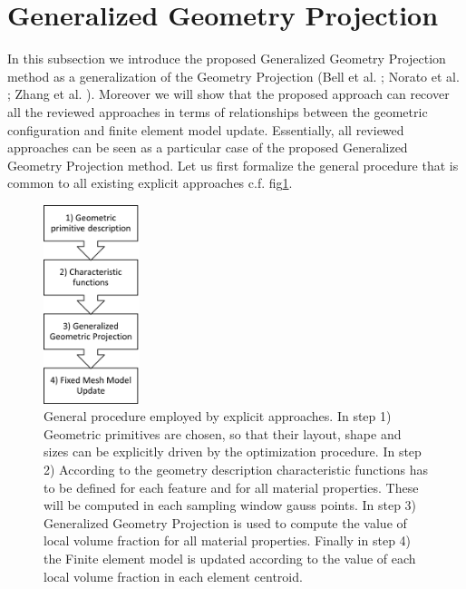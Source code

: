 \section{Generalized Geometry Projection}
\label{GGP}
In this subsection we introduce the proposed Generalized Geometry Projection method as a generalization of the Geometry Projection (Bell et al. \cite{bell2012geometry}; Norato et al. \cite{norato2015geometry}; Zhang et al. \cite{zhang2016geometry}). Moreover we will show that the proposed approach can recover all the reviewed approaches in terms of relationships between the geometric configuration and finite element model update. Essentially, all reviewed approaches can be seen as a particular case of the proposed Generalized Geometry Projection method. 
Let us first formalize the general procedure that is common to all existing explicit approaches c.f. fig\ref{fig:1}.
\begin{figure}[ht]
\centering
  \includegraphics[width=0.25\textwidth]{images/Ch3/geometry_projection_scheme.png}
\caption{General procedure employed by explicit approaches. In step 1) Geometric primitives are chosen, so that their layout, shape and sizes can be explicitly driven by the optimization procedure. In step 2) According to the geometry description characteristic functions has to be defined for each feature and for all material properties. These will be computed in each sampling window gauss points. In step 3) Generalized Geometry Projection is used to compute the value of local volume fraction for all material properties. Finally in step 4) the Finite element model is updated according to the value of each local volume fraction in each element centroid. }
\label{fig:1}       %
\end{figure}
